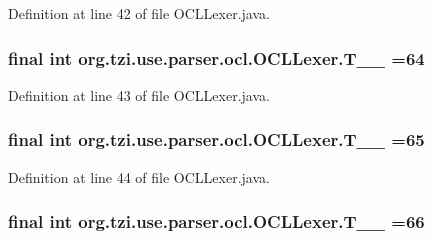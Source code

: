 Definition at line 42 of file O\-C\-L\-Lexer.\-java.

\hypertarget{classorg_1_1tzi_1_1use_1_1parser_1_1ocl_1_1_o_c_l_lexer_a0fcbf4fe2e60d7f37165fc0de39f7677}{
\subsubsection[{T\-\_\-\-\_\-64}]{\setlength{\rightskip}{0pt plus 5cm}final int org.\-tzi.\-use.\-parser.\-ocl.\-O\-C\-L\-Lexer.\-T\-\_\-\-\_ =64\hspace{0.3cm}{\ttfamily [static]}}}\label{classorg_1_1tzi_1_1use_1_1parser_1_1ocl_1_1_o_c_l_lexer_a0fcbf4fe2e60d7f37165fc0de39f7677}


Definition at line 43 of file O\-C\-L\-Lexer.\-java.

\hypertarget{classorg_1_1tzi_1_1use_1_1parser_1_1ocl_1_1_o_c_l_lexer_af14ecf88755b12dc63b5d17f7a9d32af}{
\subsubsection[{T\-\_\-\-\_\-65}]{\setlength{\rightskip}{0pt plus 5cm}final int org.\-tzi.\-use.\-parser.\-ocl.\-O\-C\-L\-Lexer.\-T\-\_\-\-\_ =65\hspace{0.3cm}{\ttfamily [static]}}}\label{classorg_1_1tzi_1_1use_1_1parser_1_1ocl_1_1_o_c_l_lexer_af14ecf88755b12dc63b5d17f7a9d32af}


Definition at line 44 of file O\-C\-L\-Lexer.\-java.

\hypertarget{classorg_1_1tzi_1_1use_1_1parser_1_1ocl_1_1_o_c_l_lexer_ad7c88e998f23b517bcbb146dea202ea5}{
\subsubsection[{T\-\_\-\-\_\-66}]{\setlength{\rightskip}{0pt plus 5cm}final int org.\-tzi.\-use.\-parser.\-ocl.\-O\-C\-L\-Lexer.\-T\-\_\-\-\_ =66\hspace{0.3cm}{\ttfamily [static]}}}\label{classorg_1_1tzi_1_1use_1_1parser_1_1ocl_1_1_o_c_l_lexer_ad7c88e998f23b517bcbb146dea202ea5}


